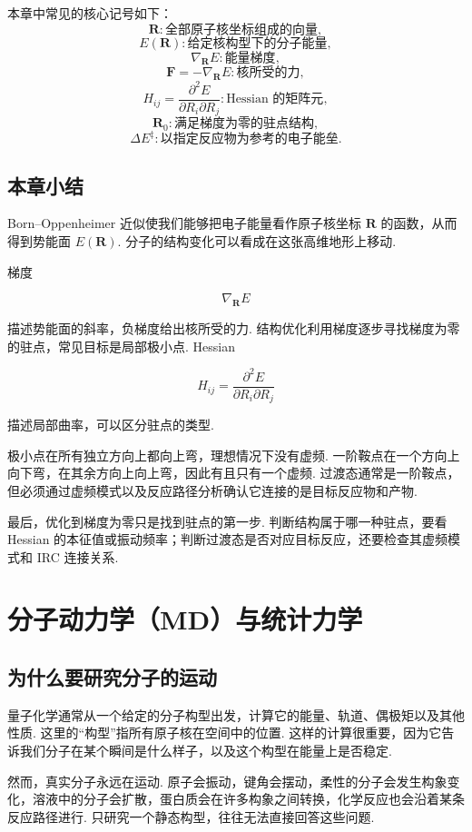 \documentclass[UTF8,11pt,a4paper,openany]{ctexbook}
\begin{document}
\begin{notationbox}
本章中常见的核心记号如下：
\[
\mathbf R:\text{全部原子核坐标组成的向量},
\]
\[
E(\mathbf R):\text{给定核构型下的分子能量},
\]
\[
\nabla_{\mathbf R}E:\text{能量梯度},
\]
\[
\mathbf F=-\nabla_{\mathbf R}E:\text{核所受的力},
\]
\[
H_{ij}=\frac{\partial^2E}{\partial R_i\partial R_j}:\text{Hessian 的矩阵元},
\]
\[
\mathbf R_0:\text{满足梯度为零的驻点结构},
\]
\[
\Delta E^\ddagger:\text{以指定反应物为参考的电子能垒}.
\]
\end{notationbox}

\section{本章小结}

Born--Oppenheimer 近似使我们能够把电子能量看作原子核坐标 $\mathbf R$ 的函数，从而得到势能面 $E(\mathbf R)$. 分子的结构变化可以看成在这张高维地形上移动. 

梯度

\[
\nabla_{\mathbf R}E
\]

描述势能面的斜率，负梯度给出核所受的力. 结构优化利用梯度逐步寻找梯度为零的驻点，常见目标是局部极小点. Hessian

\[
H_{ij}=\frac{\partial^2E}{\partial R_i\partial R_j}
\]

描述局部曲率，可以区分驻点的类型. 

极小点在所有独立方向上都向上弯，理想情况下没有虚频. 一阶鞍点在一个方向上向下弯，在其余方向上向上弯，因此有且只有一个虚频. 过渡态通常是一阶鞍点，但必须通过虚频模式以及反应路径分析确认它连接的是目标反应物和产物. 

最后，优化到梯度为零只是找到驻点的第一步. 判断结构属于哪一种驻点，要看 Hessian 的本征值或振动频率；判断过渡态是否对应目标反应，还要检查其虚频模式和 IRC 连接关系. 
\chapter{分子动力学（MD）与统计力学}

\section{为什么要研究分子的运动}

量子化学通常从一个给定的分子构型出发，计算它的能量、轨道、偶极矩以及其他性质. 这里的“构型”指所有原子核在空间中的位置. 这样的计算很重要，因为它告诉我们分子在某个瞬间是什么样子，以及这个构型在能量上是否稳定. 

然而，真实分子永远在运动. 原子会振动，键角会摆动，柔性的分子会发生构象变化，溶液中的分子会扩散，蛋白质会在许多构象之间转换，化学反应也会沿着某条反应路径进行. 只研究一个静态构型，往往无法直接回答这些问题. 
\end{document}
